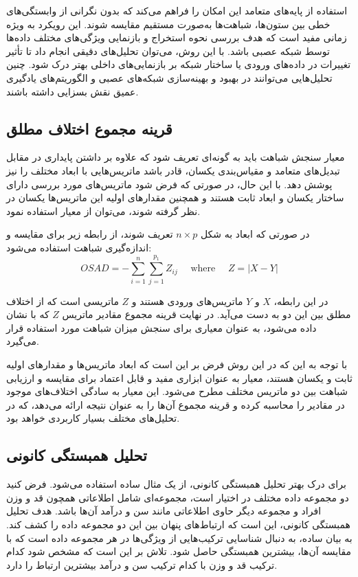 استفاده از پایه‌های متعامد این امکان را فراهم می‌کند که بدون نگرانی از وابستگی‌های خطی بین ستون‌ها، شباهت‌ها به‌صورت مستقیم مقایسه شوند. این رویکرد به ویژه زمانی مفید است که هدف بررسی نحوه استخراج و بازنمایی ویژگی‌های مختلف داده‌ها توسط شبکه عصبی باشد. با این روش، می‌توان تحلیل‌های دقیقی انجام داد تا تأثیر تغییرات در داده‌های ورودی یا ساختار شبکه بر بازنمایی‌های داخلی بهتر درک شود. چنین تحلیل‌هایی می‌توانند در بهبود و بهینه‌سازی شبکه‌های عصبی و الگوریتم‌های یادگیری عمیق نقش بسزایی داشته باشند.


\subsection{
	قرینه مجموع اختلاف مطلق%
}
معیار سنجش شباهت باید به گونه‌ای تعریف شود که علاوه بر داشتن پایداری در مقابل تبدیل‌های متعامد و مقیاس‌بندی یکسان، قادر باشد ماتریس‌هایی با ابعاد مختلف را نیز پوشش دهد. با این حال، در صورتی که فرض شود ماتریس‌های مورد بررسی دارای ساختار یکسان و ابعاد ثابت هستند و همچنین مقدار‌های اولیه این ماتریس‌ها یکسان در نظر گرفته شوند، می‌توان از معیار
استفاده نمود.

در صورتی که ابعاد به شکل \( n \times p \) تعریف شوند، از رابطه زیر برای مقایسه و اندازه‌گیری شباهت استفاده می‌شود:
\begin{equation}
	OSAD = -\sum_{i=1}^n \sum_{j=1}^{p_1} Z_{ij}
	\quad \text { where } \quad
	Z = |X-Y|
\end{equation}

در این رابطه، \( X \) و \( Y \) ماتریس‌های ورودی هستند و \( Z \) ماتریسی است که از اختلاف مطلق بین این دو به دست می‌آید. در نهایت قرینه مجموع مقادیر ماتریس \( Z \) که با
نشان داده می‌شود، به عنوان معیاری برای سنجش میزان شباهت مورد استفاده قرار می‌گیرد.

با توجه به این که در این روش فرض بر این است که ابعاد ماتریس‌ها و مقدار‌های اولیه ثابت و یکسان هستند، معیار
به عنوان ابزاری مفید و قابل اعتماد برای مقایسه و ارزیابی شباهت بین دو ماتریس مختلف مطرح می‌شود. این معیار به سادگی اختلاف‌های موجود در مقادیر را محاسبه کرده و قرینه مجموع آن‌ها را به عنوان نتیجه ارائه می‌دهد، که در تحلیل‌های مختلف بسیار کاربردی خواهد بود.




\subsection{
	تحلیل همبستگی کانونی%
}
برای درک بهتر تحلیل همبستگی کانونی، از یک مثال ساده استفاده می‌شود. فرض کنید دو مجموعه داده مختلف در اختیار است، مجموعه‌ای شامل اطلاعاتی همچون قد و وزن افراد و مجموعه دیگر حاوی اطلاعاتی مانند سن و درآمد آن‌ها باشد. هدف تحلیل همبستگی کانونی، این است که ارتباط‌های پنهان بین این دو مجموعه داده را کشف کند. به بیان ساده،
به دنبال شناسایی ترکیب‌هایی از ویژگی‌ها در هر مجموعه داده است که با مقایسه آن‌ها، بیشترین همبستگی حاصل شود. تلاش بر این است که مشخص شود کدام ترکیب قد و وزن با کدام ترکیب سن و درآمد بیشترین ارتباط را دارد.


